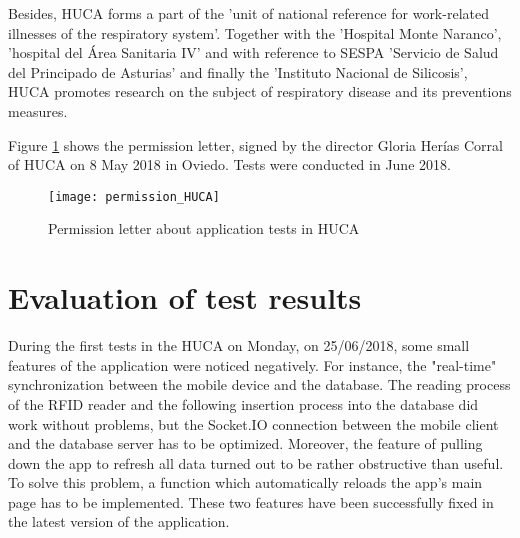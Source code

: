 Besides, HUCA forms a part of the 'unit of national reference for work-related illnesses of the respiratory system'. Together with the 'Hospital Monte Naranco', 'hospital del Área Sanitaria IV' and with reference to \ac{SESPA} 'Servicio de Salud del Principado de Asturias' and finally the 'Instituto Nacional de Silicosis', HUCA promotes research on the subject of respiratory disease and its preventions measures.

Figure \ref{fig:permission} shows the permission letter, signed by the director Gloria Herías Corral of HUCA on 8 May 2018 in Oviedo.
Tests were conducted in June 2018.

\begin{figure}
\centering
\texttt{[image: permission\_HUCA]} 
\caption{\label{fig:permission}Permission letter about application tests in HUCA} 
\end{figure}

\section{Evaluation of test results}

During the first tests in the HUCA on Monday, on 25/06/2018, some small features of the application were noticed negatively. For instance, the "real-time" synchronization between the mobile device and the database. The reading process of the RFID reader and the following insertion process into the database did work without problems, but the Socket.IO connection between the mobile client and the database server has to be optimized. Moreover, the feature of pulling down the app to refresh all data turned out to be rather obstructive than useful. To solve this problem, a function which automatically reloads the app's main page has to be implemented. These two features have been successfully fixed in the latest version of the application.
